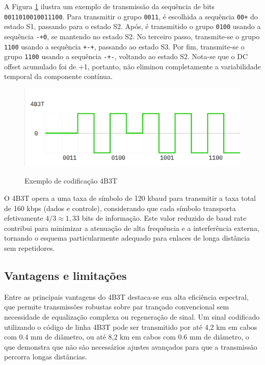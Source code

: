 \documentclass[conference]{IEEEtran}
\begin{document}
A Figura \ref{fig:4b3t-exemplo} ilustra um exemplo de transmissão da sequência de bits \texttt{0011010010011100}. Para transmitir o grupo \texttt{0011}, é escolhida a sequência \texttt{00+} do estado S1, passando para o estado S2.  Após, é transmitido o grupo \texttt{0100} usando a sequência \texttt{-+0}, se mantendo no estado S2. No terceiro passo, transmite-se o grupo \texttt{1100} usando a sequência \texttt{+-+}, passando ao estado S3. Por fim, transmite-se o grupo \texttt{1100} usando a sequência \texttt{-+-}, voltando ao estado S2. Nota-se que o DC offset acumulado foi de +1, portanto, não eliminou completamente a variabilidade temporal da componente contínua.

\begin{figure}[ht]
  \centering
  \caption{Exemplo de codificação 4B3T}
  \includegraphics[width=0.9\linewidth,trim={2 0 0 0},clip]{4b3t-example.png}
  \label{fig:4b3t-exemplo}
\end{figure}

O 4B3T opera a uma taxa de símbolo de 120 kbaud para transmitir a taxa total de 160 kbps (dados e controle), considerando que cada símbolo transporta efetivamente $4/3 \approx 1{,}33$ bits de informação. Este valor reduzido de baud rate contribui para minimizar a atenuação de alta frequência e a interferência externa, tornando o esquema particularmente adequado para enlaces de longa distância sem repetidores.

\subsection{Vantagens e limitações}

Entre as principais vantagens do 4B3T destaca-se sua alta eficiência espectral, que permite transmissões robustas sobre par trançado convencional sem necessidade de equalização complexa ou regeneração de sinal. Um sinal codificado utilizando o código de linha 4B3T pode ser transmitido por até 4,2 km em cabos com 0.4 mm de diâmetro, ou até 8,2 km em cabos com 0.6 mm de diâmetro, o que demonstra que não são necessários ajustes avançados para que a transmissão percorra longas distâncias.
\end{document}
